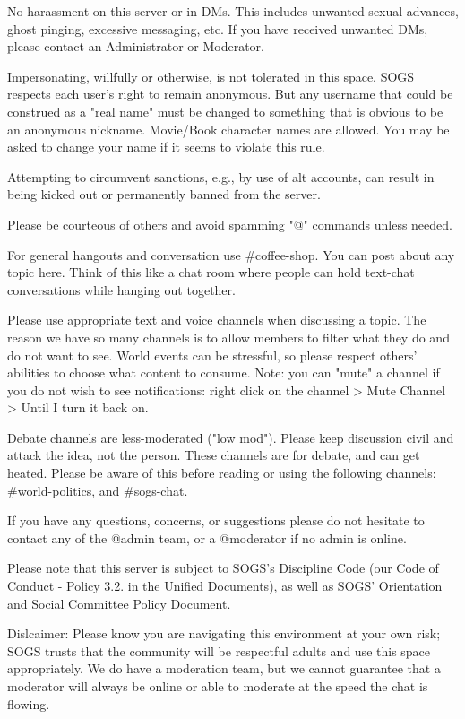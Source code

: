 \begin{longenum}[ label*=\thesubsection.\arabic*., align=left]
\begin{longenum}[label*=\arabic*., align=left]
			\item No harassment on this server or in DMs. This includes unwanted sexual advances, ghost pinging, excessive messaging, etc. If you have received unwanted DMs, please contact an Administrator or Moderator.
			\item Impersonating, willfully or otherwise, is not tolerated in this space. SOGS respects each user's right to remain anonymous. But any username that could be construed as a "real name" must be changed to something that is obvious to be an anonymous nickname. Movie/Book character names are allowed. You may be asked to change your name if it seems to violate this rule.
			\item Attempting to circumvent sanctions, e.g., by use of alt accounts, can result in being kicked out or permanently banned from the server.
			\item Please be courteous of others and avoid spamming "@" commands unless needed.
			\item For general hangouts and conversation use \#coffee-shop. You can post about any topic here. Think of this like a chat room where people can hold text-chat conversations while hanging out together.
			\item Please use appropriate text and voice channels when discussing a topic. The reason we have so many channels is to allow members to filter what they do and do not want to see. World events can be stressful, so please respect others' abilities to choose what content to consume. Note: you can "mute" a channel if you do not wish to see notifications: right click on the channel > Mute Channel > Until I turn it back on.
			\item Debate channels are less-moderated ("low mod"). Please keep discussion civil and attack the idea, not the person. These channels are for debate, and can get heated. Please be aware of this before reading or using the following channels: \#world-politics, and \#sogs-chat.
			\item If you have any questions, concerns, or suggestions please do not hesitate to contact any of the @admin team, or a @moderator if no admin is online.
			\item Please note that this server is subject to SOGS's Discipline Code (our Code of Conduct - Policy 3.2. in the Unified Documents), as well as SOGS' Orientation and Social Committee Policy Document.			
			\item Dislcaimer: Please know you are navigating this environment at your own risk; SOGS trusts that the community will be respectful adults and use this space appropriately. We do have a moderation team, but we cannot guarantee that a moderator will always be online or able to moderate at the speed the chat is flowing.
		\end{longenum}								
\end{longenum}















